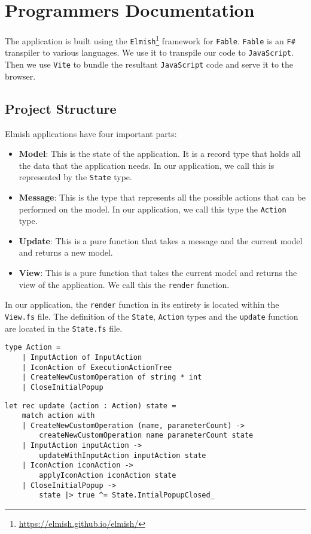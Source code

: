 \documentclass{report}
\begin{document}
\chapter*{Programmers Documentation}
The application is built using the \texttt{Elmish}\footnote{\url{https://elmish.github.io/elmish/}} framework for \texttt{Fable}. \texttt{Fable} is an \texttt{F\#} transpiler to various languages.
We use it to transpile our code to \texttt{JavaScript}. Then we use \texttt{Vite} to bundle the resultant \texttt{JavaScript} code and serve it to the browser.

\section*{Project Structure}
Elmish applications have four important parts:
\begin{itemize}
    \item \textbf{Model}: This is the state of the application. It is a record type that holds all the data that the application needs. In our application, we call this is represented by the \texttt{State} type.
    \item \textbf{Message}: This is the type that represents all the possible actions that can be performed on the model. In our application, we call this type the \texttt{Action} type.
    \item \textbf{Update}: This is a pure function that takes a message and the current model and returns a new model.
    \item \textbf{View}: This is a pure function that takes the current model and returns the view of the application. We call this the \texttt{render} function.
\end{itemize}

In our application, the \texttt{render} function in its entirety is located within the \texttt{View.fs} file.
The definition of the \texttt{State}, \texttt{Action} types and the \texttt{update} function are located in the \texttt{State.fs} file.


\begin{lstlisting}
type Action =
    | InputAction of InputAction
    | IconAction of ExecutionActionTree
    | CreateNewCustomOperation of string * int
    | CloseInitialPopup
\end{lstlisting}
\label{code:state}

\begin{lstlisting}
let rec update (action : Action) state =
    match action with
    | CreateNewCustomOperation (name, parameterCount) ->
        createNewCustomOperation name parameterCount state
    | InputAction inputAction ->
        updateWithInputAction inputAction state
    | IconAction iconAction ->
        applyIconAction iconAction state
    | CloseInitialPopup ->
        state |> true ^= State.IntialPopupClosed_
\end{lstlisting}
\label{code:update}
\end{document}
